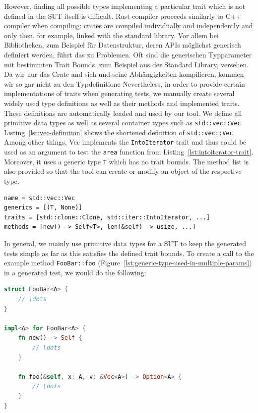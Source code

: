 \documentclass{article}
\begin{document}
However, finding all possible types implementing a particular trait which is not defined in the \ac{SUT} itself is difficult. Rust compiler proceeds similarly to C++ compiler when compiling: crates are compiled individually and independently and only then, for example, linked with the standard library. Vor allem bei Bibliotheken, zum Beispiel für Datenstruktur, deren \acp{API} möglichst generisch definiert werden, führt das zu Problemen. Oft sind die generischen Typparameter mit bestimmten Trait Bounds, zum Beispiel aus der Standard Library, versehen. Da wir nur das Crate and sich und seine Abhängigkeiten kompilieren, kommen wir so gar nicht zu den Typdefinitione Nevertheless, in order to provide certain implementations of traits when generating tests, we manually create several widely used type definitions as well as their methods and implemented traits. These definitions are automatically loaded and used by our tool. We define all primitive data types as well as several container types such as \lstinline{std::vec::Vec}. Listing~\ref{lst:vec-definition} shows the shortened definition of \lstinline{std::vec::Vec}. Among other things, Vec implements the \lstinline{IntoIterator} trait and thus could be used as an argument to test the \lstinline{area} function from Listing~\ref{lst:intoiterator-trait}. Moreover, it uses a generic type \lstinline{T} which has no trait bounds. The method list is also provided so that the tool can create or modify an object of the respective type.

\begin{lstlisting}[language={}, style=boxed, caption={std::vec::Vec type definition}, label=lst:vec-definition]
name = std::vec::Vec
generics = [(T, None)]
traits = [std::clone::Clone, std::iter::IntoIterator, ...]
methods = [new() -> Self<T>, len(&self) -> usize, ...]
\end{lstlisting}

In general, we mainly use primitive data types for a \ac{SUT} to keep the generated tests simple as far as this satisfies the defined trait bounds. To create a call to the example method \lstinline{FooBar::foo} (Figure~\ref{lst:generic-type-used-in-multiple-params}) in a generated test, we would do the following:

\begin{lstlisting}[language=Rust, style=boxed, caption={A generic type A is used in multiple parameters and return value}, label=lst:generic-type-used-in-multiple-params]
struct FooBar<A> {
    // \dots
}

impl<A> for FooBar<A> {
    fn new() -> Self {
        // \dots
    }

    fn foo(&self, x: A, v: &Vec<A>) -> Option<A> {
        // \dots
    }
}
\end{lstlisting}
\end{document}
